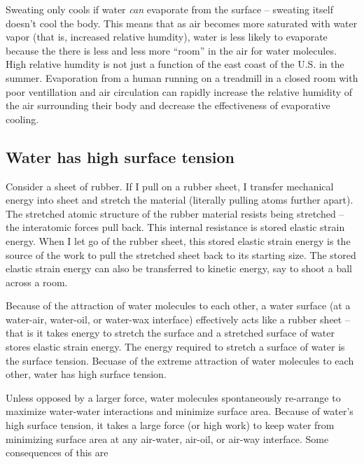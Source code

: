\documentclass[]{book}
\begin{document}
Sweating only cools if water \emph{can} evaporate from the surface --
sweating itself doesn't cool the body. This means that as air becomes
more saturated with water vapor (that is, increased relative humdity),
water is less likely to evaporate because the there is less and less
more ``room'' in the air for water molecules. High relative humdity is
not just a function of the east coast of the U.S. in the summer.
Evaporation from a human running on a treadmill in a closed room with
poor ventillation and air circulation can rapidly increase the relative
humidity of the air surrounding their body and decrease the
effectiveness of evaporative cooling.

\subsection{Water has high surface
tension}\label{water-has-high-surface-tension}

Consider a sheet of rubber. If I pull on a rubber sheet, I transfer
mechanical energy into sheet and stretch the material (literally pulling
atoms further apart). The stretched atomic structure of the rubber
material resists being stretched -- the interatomic forces pull back.
This internal resistance is stored elastic strain energy. When I let go
of the rubber sheet, this stored elastic strain energy is the source of
the work to pull the stretched sheet back to its starting size. The
stored elastic strain energy can also be transferred to kinetic energy,
say to shoot a ball across a room.

Because of the attraction of water molecules to each other, a water
surface (at a water-air, water-oil, or water-wax interface) effectively
acts like a rubber sheet -- that is it takes energy to stretch the
surface and a stretched surface of water stores elastic strain energy.
The energy required to stretch a surface of water is the surface
tension. Becuase of the extreme attraction of water molecules to each
other, water has high surface tension.

Unless opposed by a larger force, water molecules spontaneously
re-arrange to maximize water-water interactions and minimize surface
area. Because of water's high surface tension, it takes a large force
(or high work) to keep water from minimizing surface area at any
air-water, air-oil, or air-way interface. Some consequences of this are
\end{document}

